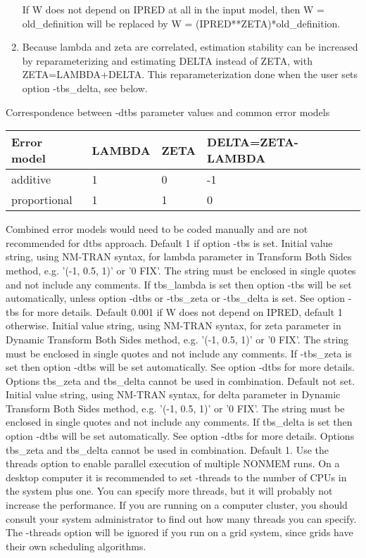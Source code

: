 \begin{optionlist}
\begin{enumerate}
If W does not depend on IPRED at all in the input model, then W = old\_definition will be replaced by
W = (IPRED**ZETA)*old\_definition.
\item Because lambda and zeta are correlated, estimation stability can be increased 
by reparameterizing and estimating DELTA instead of ZETA, with ZETA=LAMBDA+DELTA. 
This reparameterization done when the user sets option -tbs\_delta, see below.
\end{enumerate}
Correspondence between -dtbs parameter values and common error models\\
\begin{tabular}{|l|l|l|l|}
\hline
Error model & LAMBDA & ZETA & DELTA=ZETA-LAMBDA\\
\hline
additive & 1 & 0 & -1 \\
\hline
proportional & 1 & 1 & 0 \\
\hline
\end{tabular}
Combined error models would need to be coded manually and are not recommended for dtbs approach.
\nextopt
{}
Default 1 if option -tbs is set. Initial value string, using NM-TRAN syntax, for lambda parameter in Transform Both Sides method, e.g. '(-1, 0.5, 1)' or '0 FIX'. The string must be enclosed in single quotes and not include any comments. If tbs\_lambda is set then option -tbs will be set automatically, unless option -dtbs or -tbs\_zeta or -tbs\_delta is set. 
See option -tbs for more details. 
\nextopt
{}
Default 0.001 if W does not depend on IPRED, default 1 otherwise. Initial value string, using NM-TRAN syntax, for zeta parameter in Dynamic Transform Both Sides method, e.g. '(-1, 0.5, 1)' or '0 FIX'. The string must be enclosed in single quotes and not include any comments. If -tbs\_zeta is set then option -dtbs will be set automatically. See option -dtbs for more details. Options tbs\_zeta and tbs\_delta cannot be used in combination.  
\nextopt
{}
Default not set. Initial value string, using NM-TRAN syntax, for delta parameter in Dynamic Transform Both Sides method, e.g. '(-1, 0.5, 1)' or '0 FIX'. The string must be enclosed in single quotes and not include any comments. If tbs\_delta is set then option -dtbs will be set automatically. See option -dtbs for more details. Options tbs\_zeta and tbs\_delta cannot be used in combination.  
\nextopt
{}
Default 1. Use the threads option to enable parallel execution of multiple NONMEM runs. On a desktop computer it is recommended to set -threads to the number of CPUs in the system plus one. You can specify more threads, but it will probably not increase the performance. If you are running on a computer cluster, you should consult your system administrator to find out how many threads you can specify. The -threads option will be ignored if you run on a grid system, since grids have their own scheduling algorithms. 

\end{optionlist}

